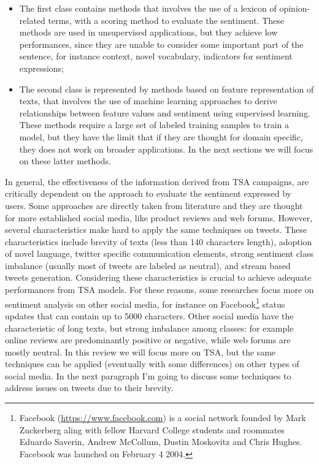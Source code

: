 \begin{itemize}
	\item The first class contains methods that involves the use of a lexicon of opinion-related terms, with a scoring method to evaluate the sentiment. These methods are used in unsupervised applications, but they achieve low performances, since they are unable to consider some important part of the sentence, for instance context, novel vocabulary, indicators for sentiment expressions;
	\item The second class is represented by methods based on feature representation of texts, that involves the use of machine learning approaches to derive relationships between feature values and sentiment using supervised learning. These methods require a large set of labeled training samples to train a model, but they have the limit that if they are thought for domain specific, they does not work on broader applications. In the next sections we will focus on these latter methods.
\end{itemize}
In general, the effectiveness of the information derived from \ac{TSA} campaigns, are critically dependent on the approach to evaluate the sentiment expressed by users. Some approaches are directly taken from literature and they are thought for more established social media, like product reviews and web forums. However, several characteristics make hard to apply the same techniques on tweets. These characteristics include brevity of texts (less than 140 characters length), adoption of novel language, twitter specific communication elements, strong sentiment class imbalance (usually most of tweets are labeled as neutral), and stream based tweets generation. Considering these characteristics is crucial to achieve adequate performances from \ac{TSA} models. For these reasons, some researches focus more on sentiment analysis on other social media, for instance on Facebook\footnote{Facebook (\url{https://www.facebook.com}) is a social network founded by Mark Zuckerberg aling with fellow Harvard College students and roommates Eduardo Saverin, Andrew McCollum, Dustin Moskovitz and Chris Hughes. Facebook was launched on February 4 2004.} status updates that can contain up to 5000 characters. Other social media have the characteristic of long texts, but strong imbalance among classes: for example online reviews are predominantly positive or negative, while web forums are mostly neutral. In this review we will focus more on \ac{TSA}, but the same techniques can be applied (eventually with some differences) on other types of social media. In the next paragraph I'm going to discuss some techniques to address issues on tweets due to their brevity.

